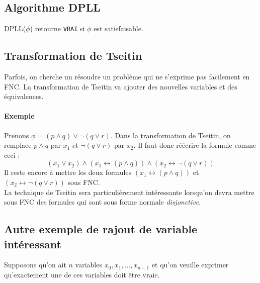 \documentclass[a4paper]{article}
\begin{document}
  \subsection{Algorithme DPLL}
  DPLL($\phi$) retourne \texttt{VRAI} si $\phi$ est satisfaisable.

  \begin{algorithm}[H]
  \end{algorithm}

  \subsection{Transformation de Tseitin}
  Parfois, on cherche un résoudre un problème qui ne s'exprime pas 
facilement en FNC.
  La transformation de Tseitin va ajouter des nouvelles variables et des 
équivalences.

    \paragraph{Exemple} Prenons $ \phi = (p \land q) \lor \lnot (q \lor 
r) $. Dans 
    la transformation de Tseitin, on remplace $p \land q$ par $x_1$ et 
$\lnot (q \lor r)$ par $x_2$.
    Il faut donc réécrire la formule comme ceci :
    $$ (x_1 \lor x_2) \land (x_1 \leftrightarrow (p \land q)) \land (x_2 
\leftrightarrow \lnot (q \lor r) )$$
    Il reste encore à mettre les deux formules $(x_1 \leftrightarrow (p 
\land q))$ et $(x_2 \leftrightarrow \lnot (q \lor r))$ sous FNC.\\

  La technique de Tseitin sera particulièrement intéressante lorsqu'on 
devra mettre
  sous FNC des formules qui sont sous forme normale 
\textit{disjonctive}.

  \subsection{Autre exemple de rajout de variable intéressant}
  Supposons qu'on ait $n$ variables $x_0, x_1, ..., x_{n-1}$ et qu'on 
veuille
  exprimer qu'exactement une de ces variables doit être vraie. 
\end{document}
